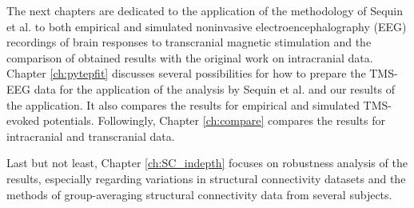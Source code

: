 The next chapters are dedicated to the application of the methodology of Sequin et al. to both empirical and simulated noninvasive electroencephalography (EEG) recordings of brain responses to transcranial magnetic stimulation and the comparison of obtained results with the original work on intracranial data. Chapter \ref{ch:pytepfit} discusses several possibilities for how to prepare the TMS-EEG data for the application of the analysis by Sequin et al. and our results of the application. It also compares the results for empirical and simulated TMS-evoked potentials. Followingly, Chapter \ref{ch:compare} compares the results for intracranial and transcranial data.

Last but not least, Chapter \ref{ch:SC_indepth} focuses on robustness analysis of the results, especially regarding variations in structural connectivity datasets and the methods of group-averaging structural connectivity data from several subjects.


